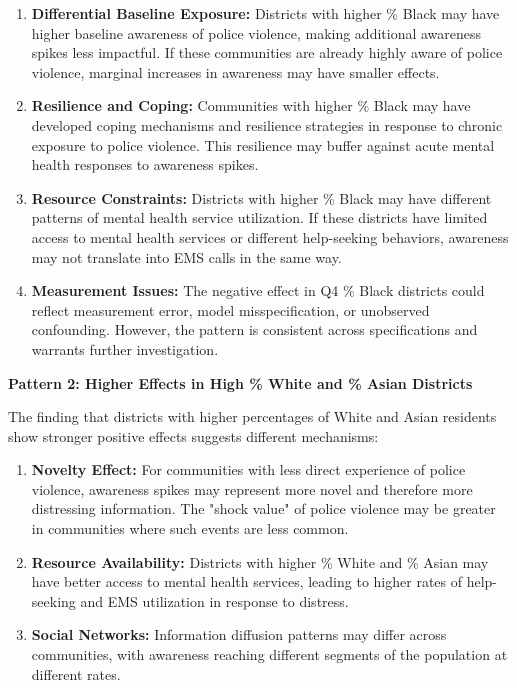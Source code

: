 \documentclass[11pt,a4paper]{article}
\begin{document}
\begin{enumerate}
    \item \textbf{Differential Baseline Exposure:} Districts with higher \% Black may have higher baseline awareness of police violence, making additional awareness spikes less impactful. If these communities are already highly aware of police violence, marginal increases in awareness may have smaller effects.
    
    \item \textbf{Resilience and Coping:} Communities with higher \% Black may have developed coping mechanisms and resilience strategies in response to chronic exposure to police violence. This resilience may buffer against acute mental health responses to awareness spikes.
    
    \item \textbf{Resource Constraints:} Districts with higher \% Black may have different patterns of mental health service utilization. If these districts have limited access to mental health services or different help-seeking behaviors, awareness may not translate into EMS calls in the same way.
    
    \item \textbf{Measurement Issues:} The negative effect in Q4 \% Black districts could reflect measurement error, model misspecification, or unobserved confounding. However, the pattern is consistent across specifications and warrants further investigation.
\end{enumerate}

\textbf{Pattern 2: Higher Effects in High \% White and \% Asian Districts}

The finding that districts with higher percentages of White and Asian residents show stronger positive effects suggests different mechanisms:

\begin{enumerate}
    \item \textbf{Novelty Effect:} For communities with less direct experience of police violence, awareness spikes may represent more novel and therefore more distressing information. The "shock value" of police violence may be greater in communities where such events are less common.
    
    \item \textbf{Resource Availability:} Districts with higher \% White and \% Asian may have better access to mental health services, leading to higher rates of help-seeking and EMS utilization in response to distress.
    
    \item \textbf{Social Networks:} Information diffusion patterns may differ across communities, with awareness reaching different segments of the population at different rates.
\end{enumerate}
\end{document}
